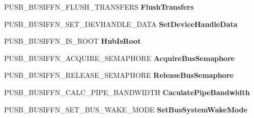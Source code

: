 \begin{DoxyCompactItemize}
\item 
\mbox{\label{struct___u_s_b___b_u_s___i_n_t_e_r_f_a_c_e___h_u_b___v7_a1222cd5c3f8a2b93e980ff7c87ca643a}} 
P\+U\+S\+B\+\_\+\+B\+U\+S\+I\+F\+F\+N\+\_\+\+F\+L\+U\+S\+H\+\_\+\+T\+R\+A\+N\+S\+F\+E\+RS {\bfseries Flush\+Transfers}
\item 
\mbox{\label{struct___u_s_b___b_u_s___i_n_t_e_r_f_a_c_e___h_u_b___v7_a39cf95f51ad584116221710c102bf5ff}} 
P\+U\+S\+B\+\_\+\+B\+U\+S\+I\+F\+F\+N\+\_\+\+S\+E\+T\+\_\+\+D\+E\+V\+H\+A\+N\+D\+L\+E\+\_\+\+D\+A\+TA {\bfseries Set\+Device\+Handle\+Data}
\item 
\mbox{\label{struct___u_s_b___b_u_s___i_n_t_e_r_f_a_c_e___h_u_b___v7_adcf73df0ad14c1b6152ffcdf5bcf2dc7}} 
P\+U\+S\+B\+\_\+\+B\+U\+S\+I\+F\+F\+N\+\_\+\+I\+S\+\_\+\+R\+O\+OT {\bfseries Hub\+Is\+Root}
\item 
\mbox{\label{struct___u_s_b___b_u_s___i_n_t_e_r_f_a_c_e___h_u_b___v7_a623a14a33e7b37672671d3d8a6fb212f}} 
P\+U\+S\+B\+\_\+\+B\+U\+S\+I\+F\+F\+N\+\_\+\+A\+C\+Q\+U\+I\+R\+E\+\_\+\+S\+E\+M\+A\+P\+H\+O\+RE {\bfseries Acquire\+Bus\+Semaphore}
\item 
\mbox{\label{struct___u_s_b___b_u_s___i_n_t_e_r_f_a_c_e___h_u_b___v7_a169c5b2eb23aec4ba0225890d6b0a5c3}} 
P\+U\+S\+B\+\_\+\+B\+U\+S\+I\+F\+F\+N\+\_\+\+R\+E\+L\+E\+A\+S\+E\+\_\+\+S\+E\+M\+A\+P\+H\+O\+RE {\bfseries Release\+Bus\+Semaphore}
\item 
\mbox{\label{struct___u_s_b___b_u_s___i_n_t_e_r_f_a_c_e___h_u_b___v7_a4c8c24d57013ca7fd3ef452f526187c8}} 
P\+U\+S\+B\+\_\+\+B\+U\+S\+I\+F\+F\+N\+\_\+\+C\+A\+L\+C\+\_\+\+P\+I\+P\+E\+\_\+\+B\+A\+N\+D\+W\+I\+D\+TH {\bfseries Caculate\+Pipe\+Bandwidth}
\item 
\mbox{\label{struct___u_s_b___b_u_s___i_n_t_e_r_f_a_c_e___h_u_b___v7_a49728bdf45324eeb7f07ea9f5287b32c}} 
P\+U\+S\+B\+\_\+\+B\+U\+S\+I\+F\+F\+N\+\_\+\+S\+E\+T\+\_\+\+B\+U\+S\+\_\+\+W\+A\+K\+E\+\_\+\+M\+O\+DE {\bfseries Set\+Bus\+System\+Wake\+Mode}

\end{DoxyCompactItemize}
